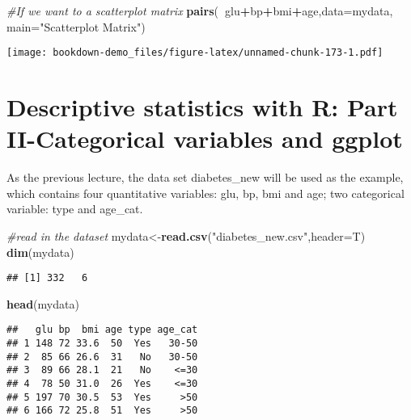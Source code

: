 \documentclass[]{book}
\newenvironment{Shaded}{\begin{snugshade}}{\end{snugshade}}
\newcommand{\KeywordTok}[1]{\textcolor[rgb]{0.13,0.29,0.53}{\textbf{#1}}}
\newcommand{\DataTypeTok}[1]{\textcolor[rgb]{0.13,0.29,0.53}{#1}}
\newcommand{\StringTok}[1]{\textcolor[rgb]{0.31,0.60,0.02}{#1}}
\newcommand{\CommentTok}[1]{\textcolor[rgb]{0.56,0.35,0.01}{\textit{#1}}}
\newcommand{\OperatorTok}[1]{\textcolor[rgb]{0.81,0.36,0.00}{\textbf{#1}}}
\newcommand{\NormalTok}[1]{#1}
\theoremstyle{definition}
\theoremstyle{definition}
\theoremstyle{definition}
\theoremstyle{remark}
\begin{document}
\begin{Shaded}
\begin{Highlighting}[]
\CommentTok{#If we want to a scatterplot matrix}
\KeywordTok{pairs}\NormalTok{(}\OperatorTok{~}\NormalTok{glu}\OperatorTok{+}\NormalTok{bp}\OperatorTok{+}\NormalTok{bmi}\OperatorTok{+}\NormalTok{age,}\DataTypeTok{data=}\NormalTok{mydata, }
   \DataTypeTok{main=}\StringTok{"Scatterplot Matrix"}\NormalTok{)}
\end{Highlighting}
\end{Shaded}

\texttt{[image: bookdown-demo\_files/figure-latex/unnamed-chunk-173-1.pdf]}

\chapter{Descriptive statistics with R: Part II-Categorical variables
and
ggplot}\label{descriptive-statistics-with-r-part-ii-categorical-variables-and-ggplot}

As the previous lecture, the data set diabetes\_new will be used as the
example, which contains four quantitative variables: glu, bp, bmi and
age; two categorical variable: type and age\_cat.

\begin{Shaded}
\begin{Highlighting}[]
\CommentTok{#read in the dataset}
\NormalTok{mydata<-}\KeywordTok{read.csv}\NormalTok{(}\StringTok{"diabetes_new.csv"}\NormalTok{,}\DataTypeTok{header=}\NormalTok{T)}
\KeywordTok{dim}\NormalTok{(mydata)}
\end{Highlighting}
\end{Shaded}

\begin{verbatim}
## [1] 332   6
\end{verbatim}

\begin{Shaded}
\begin{Highlighting}[]
\KeywordTok{head}\NormalTok{(mydata)}
\end{Highlighting}
\end{Shaded}

\begin{verbatim}
##   glu bp  bmi age type age_cat
## 1 148 72 33.6  50  Yes   30-50
## 2  85 66 26.6  31   No   30-50
## 3  89 66 28.1  21   No    <=30
## 4  78 50 31.0  26  Yes    <=30
## 5 197 70 30.5  53  Yes     >50
## 6 166 72 25.8  51  Yes     >50
\end{verbatim}
\end{document}
